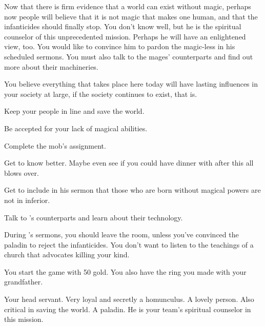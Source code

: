 \documentclass[char]{guildcamp3}
\begin{document}
Now that there is firm evidence that a world can exist without magic, perhaps now people will believe that it is not magic that makes one human, and that the infanticides should finally stop. You don't know \cPaladin{} well, but he is the spiritual counselor of this unprecedented mission. Perhaps he will have an enlightened view, too. You would like to convince him to pardon the magic-less in his scheduled sermons. You must also talk to the mages' counterparts and find out more about their machineries.

You believe everything that takes place here today will have lasting influences in your society at large, if the society continues to exist, that is.

\begin{itemz}[Goals]
  \item Keep your people in line and save the world.
  \item Be accepted for your lack of magical abilities.
  \item Complete the mob's assignment.
  \item Get to know \cMageOne{} better. Maybe even see if you could have dinner with \cMageOne{\them} after this all blows over. 
  \item Get \cPaladin{} to include in his sermon that those who are born without magical powers are not in inferior.
  \item Talk to \bTechWorld{}'s counterparts and learn about their technology.
\end{itemz}

\begin{itemz}[Notes]
	\item During \cPaladin{\formal}'s sermons, you should leave the room, unless you've convinced the paladin to reject the infanticides. You don't want to listen to the teachings of a church that advocates killing your kind. 
	\item You start the game with 50 gold. You also have the ring you made with your grandfather.
\end{itemz}


\begin{contacts}
  \contact{\cServant{}} Your head servant. Very loyal and secretly a homunculus. 
  \contact{\cMageOne{}} A lovely person. Also critical in saving the world.
  \contact{\cPaladin{}} A paladin. He is your team's spiritual counselor in this mission.
\end{contacts}
\end{document}
